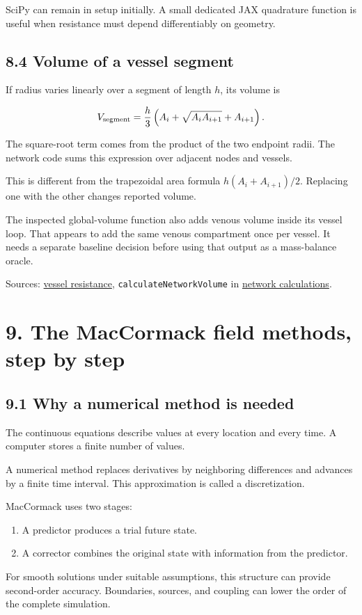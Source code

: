 \documentclass[11pt,a4paper]{article}
\begin{document}
SciPy can remain in setup initially. A small dedicated JAX quadrature function is useful when resistance must depend differentiably on geometry.

\subsection{8.4 Volume of a vessel segment}
If radius varies linearly over a segment of length \(h\), its volume is


\begingroup\small
\[
V_{\rm segment}
=\frac h3\left(A_i+\sqrt{A_iA_{i+1}}+A_{i+1}\right).
\]
\endgroup


The square-root term comes from the product of the two endpoint radii. The network code sums this expression over adjacent nodes and vessels.

This is different from the trapezoidal area formula \(h(A_i+A_{i+1})/2\). Replacing one with the other changes reported volume.

The inspected global-volume function also adds venous volume inside its vessel loop. That appears to add the same venous compartment once per vessel. It needs a separate baseline decision before using that output as a mass-balance oracle.

Sources: \href{/home/sadid/starfish/NetworkLib/classVessel.py}{vessel resistance}, \texttt{calculateNetworkVolume} in \href{/home/sadid/starfish/NetworkLib/classVascularNetwork.py}{network calculations}.

\clearpage
\section{9. The MacCormack field methods, step by step}
\subsection{9.1 Why a numerical method is needed}
The continuous equations describe values at every location and every time. A computer stores a finite number of values.

A numerical method replaces derivatives by neighboring differences and advances by a finite time interval. This approximation is called a discretization.

MacCormack uses two stages:


\begin{enumerate}
\item A predictor produces a trial future state.


\item A corrector combines the original state with information from the predictor.


\end{enumerate}
For smooth solutions under suitable assumptions, this structure can provide second-order accuracy. Boundaries, sources, and coupling can lower the order of the complete simulation.
\end{document}
